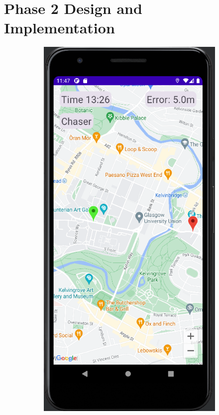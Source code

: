 \documentclass{l4proj}
\begin{document}
\chapter{Phase 2 Design and Implementation}
\label{phase2design}

\begin{figure}
    \label{fig:phase2_ui}
    \centering
    \begin{subfigure}[b]{0.3\textwidth}
        \includegraphics[width=\textwidth]{images/phase2_ui_chaser.png}

\end{subfigure}
\end{figure}
\end{document}
